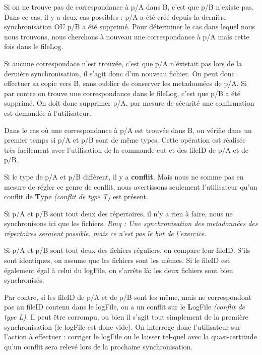 \documentclass[a4paper,12pt]{report}
\begin{document}
\begin{onehalfspace}
				Si on ne trouve pas de correspondance à p/A dans B, c'est que p/B n'existe pas. Dans ce cas, il y a deux cas possibles : p/A a été créé depuis la dernière synchronisation OU p/B a été supprimé. Pour déterminer le cas dans lequel nous nous trouvons, nous cherchons à nouveau une correspondance à p/A mais cette fois dans le fileLog.
				
				Si aucune correspondace n'est trouvée, c'est que p/A n'éxistait pas lors de la dernière synchronisation, il s'agit donc d'un nouveau fichier. On peut donc effectuer sa copie vers B, sans oublier de conserver les metadonnées de p/A. Si par contre on trouve une correspondance dans le fileLog, c'est que p/B a été supprimé. On doit donc supprimer p/A, par mesure de sécurité une confirmation est demandée à l'utilisateur.

				\vspace{0.5cm}

				Dans le cas où une correspondance à p/A est trouvée dans B, on vérifie dans un premier temps si p/A et p/B sont de même types. Cette opération est réalisée très facilement avec l'utilisation de la commande cut et des fileID de p/A et de p/B.

				Si le type de p/A et p/B diffèrent, il y a \textbf{conflit}. Mais nous ne somme pas en mesure de régler ce genre de conflit, nous avertissons seulement l'utilisateur qu'un conflit de \textbf{T}ype \textit{(conflit de type T)} est présent.

				Si p/A et p/B sont tout deux des répertoires, il n'y a rien à faire, nous ne synchronisons ici que les fichiers. \textit{Rmq : Une synchronisation des metadonnées des répertoires seraient possible, mais ce n'est pas le but de l'exercice.}

				Si p/A et p/B sont tout deux des fichiers réguliers, on compare leur fileID. S'ils sont identiques, on assume que les fichiers sont les mêmes. Si le fileID est également égal à celui du logFile, on s'arrête là: les deux fichiers sont bien synchronisés.

				Par contre, si les fileID de p/A et de p/B sont les même, mais ne correspondont pas au fileID contenu dans le logFile, on a un conflit sur le \textbf{L}ogFile \textit{(conflit de type L)}. Il peut être corrompu, ou bien il s'agit tout simplement de la première synchronisation (le logFile est donc vide). On interroge donc l'utilisateur sur l'action à effectuer : corriger le logFile ou le laisser tel-quel avec la quasi-certitude qu'un conflit sera relevé lors de la prochaine synchronisation.


\end{onehalfspace}
\end{document}
